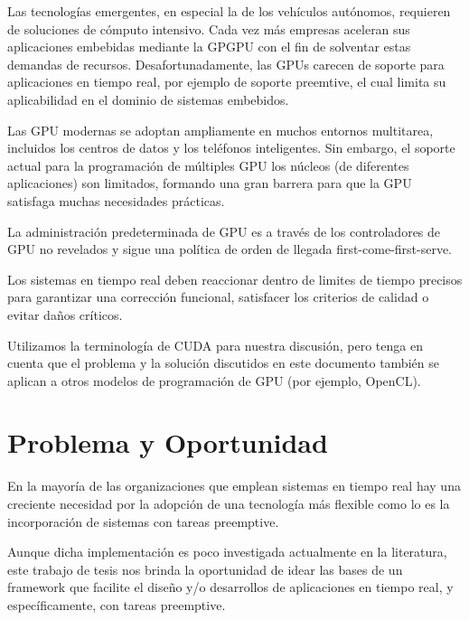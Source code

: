 



Las tecnologías emergentes, en especial la de los vehículos autónomos, requieren de soluciones de cómputo intensivo. Cada vez más empresas aceleran sus aplicaciones embebidas mediante la GPGPU con el fin de solventar estas demandas de recursos. Desafortunadamente, las GPUs carecen de soporte para aplicaciones en tiempo real, por ejemplo de soporte preemtive, el cual limita su aplicabilidad en el dominio de sistemas embebidos.

Las GPU modernas se adoptan ampliamente en muchos entornos multitarea, incluidos los centros de datos y los teléfonos inteligentes. Sin embargo, el soporte actual para la programación de múltiples GPU
los núcleos (de diferentes aplicaciones) son limitados, formando una gran barrera para que la GPU satisfaga muchas necesidades prácticas.

La administración predeterminada de GPU es a través de los controladores de GPU no revelados y sigue una política de orden de llegada first-come-first-serve.

Los sistemas en tiempo real deben reaccionar dentro de limites de tiempo precisos para garantizar una corrección funcional, satisfacer los criterios de calidad o evitar daños críticos.

Utilizamos la terminología de CUDA para nuestra discusión, pero tenga en cuenta que el problema y la solución discutidos en este documento también se aplican a otros modelos de programación de GPU (por ejemplo, OpenCL).



\section{Problema y Oportunidad}
En la mayoría de las organizaciones que emplean sistemas en tiempo real hay una creciente necesidad por la adopción de una tecnología más flexible como lo es la incorporación de sistemas con tareas preemptive.

Aunque dicha implementación es poco investigada actualmente en la literatura, este trabajo de tesis nos brinda la oportunidad de idear las bases de un framework que facilite el diseño y/o desarrollos de aplicaciones en tiempo real, y específicamente, con tareas preemptive.

